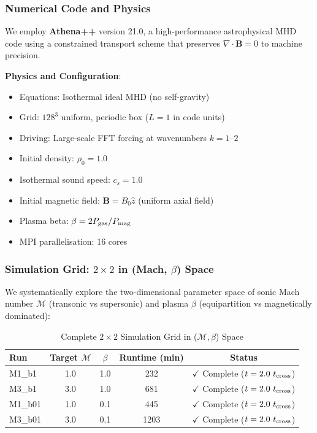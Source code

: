 \documentclass[11pt,a4paper]{article}
\begin{document}
\subsubsection{Numerical Code and Physics}

We employ \textbf{Athena++} version 21.0, a high-performance astrophysical MHD code using a constrained transport scheme that preserves $\nabla \cdot \mathbf{B} = 0$ to machine precision.

\textbf{Physics and Configuration}:
\begin{itemize}
    \item Equations: Isothermal ideal MHD (no self-gravity)
    \item Grid: $128^3$ uniform, periodic box ($L = 1$ in code units)
    \item Driving: Large-scale FFT forcing at wavenumbers $k = 1$--$2$
    \item Initial density: $\rho_0 = 1.0$
    \item Isothermal sound speed: $c_s = 1.0$
    \item Initial magnetic field: $\mathbf{B} = B_0 \hat{z}$ (uniform axial field)
    \item Plasma beta: $\beta = 2P_{\rm gas}/P_{\rm mag}$
    \item MPI parallelisation: 16 cores
\end{itemize}

\subsubsection{Simulation Grid: $2\times2$ in (Mach, $\beta$) Space}

We systematically explore the two-dimensional parameter space of sonic Mach number $\mathcal{M}$ (transonic vs supersonic) and plasma $\beta$ (equipartition vs magnetically dominated):

\begin{table}[H]
\centering
\caption{Complete $2\times2$ Simulation Grid in ($\mathcal{M}, \beta$) Space}
\begin{tabular}{lcccc}
\toprule
Run & Target $\mathcal{M}$ & $\beta$ & Runtime (min) & Status \\
\midrule
M1\_b1  & 1.0 & 1.0 & 232  & $\checkmark$ Complete ($t = 2.0~t_{\rm cross}$) \\
M3\_b1  & 3.0 & 1.0 & 681  & $\checkmark$ Complete ($t = 2.0~t_{\rm cross}$) \\
M1\_b01 & 1.0 & 0.1 & 445  & $\checkmark$ Complete ($t = 2.0~t_{\rm cross}$) \\
M3\_b01 & 3.0 & 0.1 & 1203 & $\checkmark$ Complete ($t = 2.0~t_{\rm cross}$) \\
\bottomrule
\end{tabular}
\end{table}
\end{document}
